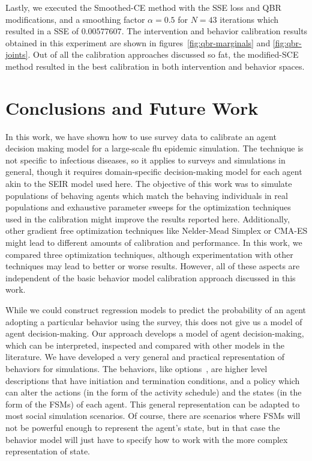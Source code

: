 \documentclass[doublespace,draft]{VTthesis}
\begin{document}
    Lastly, we executed the Smoothed-CE method with the SSE loss and QBR modifications, and a smoothing factor $\alpha = 0.5$ for $N=43$ iterations which resulted in a SSE of $0.00577607$. The intervention and behavior calibration results obtained in this experiment are shown in figures~\ref{fig:qbr-marginals} and \ref{fig:qbr-joints}. Out of all the calibration approaches discussed so fat, the modified-SCE method resulted in the best calibration in both intervention and behavior spaces.
	
	\chapter{Conclusions and Future Work} \label{ch:conclusions}
	In this work, we have shown how to use survey data to calibrate an agent decision making model for a large-scale flu epidemic simulation. The technique is not specific to infectious diseases, so it applies to surveys and simulations in general, though it requires domain-specific decision-making model for each agent akin to the SEIR model used here. The objective of this work was to simulate populations of behaving agents which match the behaving individuals in real populations and exhaustive parameter sweeps for the optimization techniques used in the calibration might improve the results reported here. Additionally, other gradient free optimization techniques like Nelder-Mead Simplex or CMA-ES might lead to different amounts of calibration and performance. In this work, we compared three optimization techniques, although experimentation with other techniques may lead to better or worse results. However, all of these aspects are independent of the basic behavior model calibration approach discussed in this work. 

    While we could construct regression models to predict the probability of an agent adopting a particular behavior using the survey, this does not give us a model of agent decision-making. Our approach develops a model of agent decision-making, which can be interpreted, inspected and compared with other models in the literature. We have developed a very general and practical representation of behaviors for simulations. The behaviors, like options~\cite{sutton99options}, are higher level descriptions that have initiation and termination conditions, and a policy which can alter the actions (in the form of the activity schedule) and the states (in the form of the FSMs) of each agent. This general representation can be adapted to most social simulation scenarios. Of course, there are scenarios where FSMs will not be powerful enough to represent the agent's state, but in that case the behavior model will just have to specify how to work with the more complex representation of state. 
    
\end{document}
